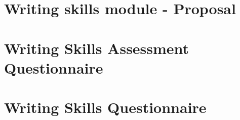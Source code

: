 \chapter{Writing skills module - Proposal}\label{appendix:proposal}


\chapter{Writing Skills Assessment Questionnaire}\label{appendix:writing_skills_assessment_questionnaire}


\chapter{Writing Skills Questionnaire}\label{appendix:writing_skills_questionnaire}
